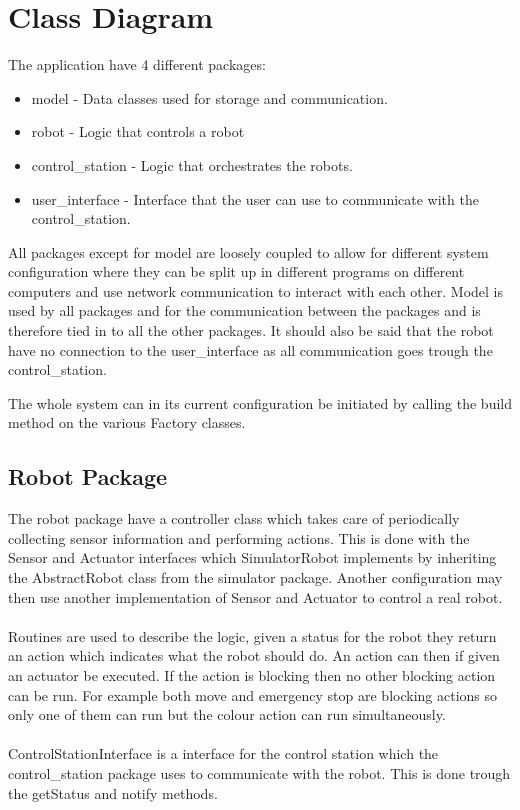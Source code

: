 \section{Class Diagram}
The application have 4 different packages:
\begin{itemize}
    \item model - Data classes used for storage and communication.
    \item robot - Logic that controls a robot
    \item control\_station - Logic that orchestrates the robots.
    \item user\_interface - Interface that the user can use to communicate with the control\_station.
\end{itemize}
All packages except for model are loosely coupled to allow for different system configuration where they can be split up in different programs on different computers and use network communication to interact with each other. Model is used by all packages and for the communication between the packages and is therefore tied in to all the other packages. It should also be said that the robot have no connection to the user\_interface as all communication goes trough the control\_station.

The whole system can in its current configuration be initiated by calling the build method on the various Factory classes.

\subsection{Robot Package}
The robot package have a controller class which takes care of periodically collecting sensor information and performing actions. This is done with the Sensor and Actuator interfaces which SimulatorRobot implements by inheriting the AbstractRobot class from the simulator package. Another configuration may then use another implementation of Sensor and Actuator to control a real robot.
\\ \\
Routines are used to describe the logic, given a status for the robot they return an action which indicates what the robot should do. An action can then if given an actuator be executed. If the action is blocking then no other blocking action can be run. For example both move and emergency stop are blocking actions so only one of them can run but the colour action can run simultaneously.
\\ \\
ControlStationInterface is a interface for the control station which the control\_station package uses to communicate with the robot. This is done trough the getStatus and notify methods.

